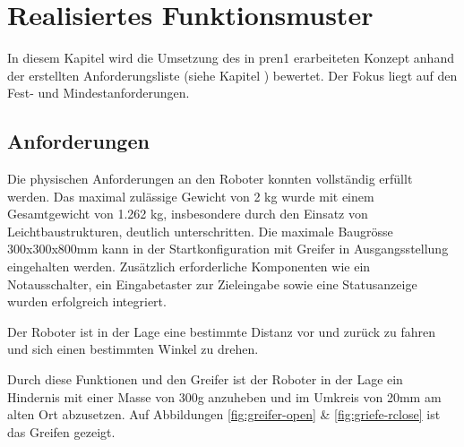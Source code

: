 \section{Realisiertes Funktionsmuster}

In diesem Kapitel wird die Umsetzung des in \acrshort{pren1} erarbeiteten Konzept anhand der erstellten Anforderungsliste (siehe Kapitel ) bewertet. Der Fokus liegt auf den Fest- und Mindestanforderungen.

\subsection{Anforderungen}

Die physischen Anforderungen an den Roboter konnten vollständig erfüllt werden. Das maximal zulässige Gewicht von 2 kg wurde mit einem Gesamtgewicht von 1.262 kg, insbesondere durch den Einsatz von Leichtbaustrukturen, deutlich unterschritten. Die maximale Baugrösse 300x300x800mm kann in der Startkonfiguration mit Greifer in Ausgangsstellung eingehalten werden. Zusätzlich erforderliche Komponenten wie ein Notausschalter, ein Eingabetaster zur Zieleingabe sowie eine Statusanzeige wurden erfolgreich integriert.

Der Roboter ist in der Lage eine bestimmte Distanz vor und zurück zu fahren und sich einen bestimmten Winkel zu drehen.

Durch diese Funktionen und den Greifer ist der Roboter in der Lage ein Hindernis mit einer Masse von 300g anzuheben und im Umkreis von 20mm am alten Ort abzusetzen. Auf Abbildungen \ref{fig:greifer-open} \& \ref{fig:griefe-rclose} ist das Greifen gezeigt.



